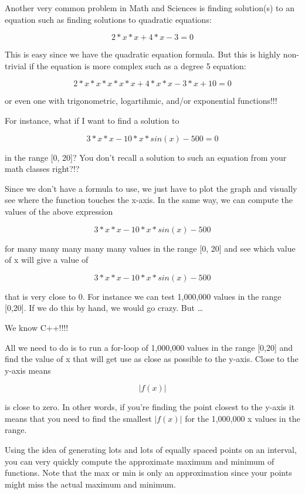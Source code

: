 \newpage{}

Another very common problem in Math and Sciences is finding solution(s)
to an equation such as finding solutions to quadratic equations:

\[2 * x * x + 4 * x - 3 = 0\]

This is easy since we have the quadratic equation formula. But this is
highly non-trivial if the equation is more complex such as a degree 5
equation:

\[2 * x * x * x * x * x + 4 * x * x - 3 * x + 10 = 0\]

or even one with trigonometric, logartihmic, and/or exponential
functions!!!

For instance, what if I want to find a solution to

\[3 * x * x - 10 * x * sin(x) - 500 = 0\]

in the range [0, 20]? You don't recall a solution to
such an equation from your math classes right?!?

Since we don't have a formula to use, we just have to
plot the graph and visually see where the function touches the x-axis.
In the same way, we can compute the values of the above expression

\[3 * x * x - 10 * x * sin(x) - 500\]

for many many many many many values in the range [0, 20] and see
which value of x will give a value of

\[3 * x * x - 10 * x * sin(x) - 500\]

that is very close to 0. For instance we can test 1,000,000 values in
the range [0,20]. If we do this by hand, we would go crazy. But
\ldots

We know C++!!!!

All we need to do is to run a for-loop of 1,000,000 values in the range
[0,20] and find the value of x that will get use as close as
possible to the y-axis. Close to the y-axis means

\[|f(x)|\]

is close to zero. In other words, if you're finding the
point closest to the y-axis it means that you need to find the smallest
$|f(x)|$ for the 1,000,000 x values in the range.

\newpage{}

Using the idea of generating lots and lots of equally spaced points on
an interval, you can very quickly compute the approximate maximum and
minimum of functions. Note that the max or min is only an approximation
since your points might miss the actual maximum and minimum.



